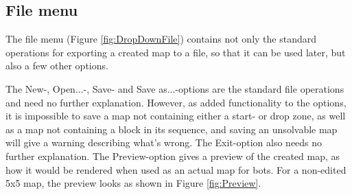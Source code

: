 \subsection{File menu}
The file menu (Figure \ref{fig:DropDownFile}) contains not only the standard operations for exporting a created map to a file, so that it can be used later, but also a few other options.

The New-, Open...-, Save- and Save as...-options are the standard file operations and need no further explanation. However, as added functionality to the options, it is impossible to save a map not containing either a start- or drop zone, as well as a map not containing a block in its sequence, and saving an unsolvable map will give a warning describing what's wrong. The Exit-option also needs no further explanation. The Preview-option gives a preview of the created map, as how it would be rendered when used as an actual map for bots. For a non-edited 5x5 map, the preview looks as shown in Figure \ref{fig:Preview}.

